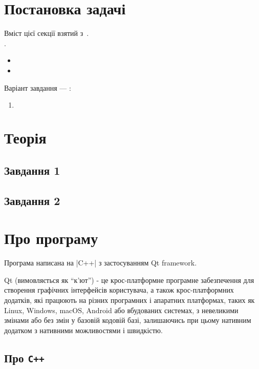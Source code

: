 \documentclass[../../../../document]{subfiles}
\begin{document}
	\chapter{Постановка задачі}
	Вміст цієї секції взятий з~\cite{computational_methods}.\\
	 \worktheme.\\
	\begin{itemize}
		\item
		\item
	\end{itemize}
	Варіант завдання --- \studentnumber:
	\begin{enumerate}
		\item
			\begin{gather}
			\end{gather}
	\end{enumerate}

	\chapter{Теорія}
	\section{Завдання 1}
	\label{sec:prb1thr}

	\section{Завдання 2}
	\label{sec:prb2thr}

	\chapter{Про програму}
	Програма написана на \textinline|C++| з застосуванням Qt framework.

	Qt (вимовляється як \enquote{к'ют}) - це крос-платформне
	програмне забезпечення для створення графічних інтерфейсів користувача, а також
	крос-платформних додатків, які працюють на різних програмних і апаратних
	платформах, таких як Linux, Windows, macOS, Android або вбудованих системах, з
	невеликими змінами або без змін у базовій кодовій базі, залишаючись при цьому
	нативним додатком з нативними можливостями і швидкістю.

	\section{Про \texttt{C++}}
\end{document}
